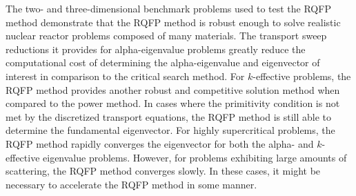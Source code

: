 The two- and three-dimensional benchmark problems used to test the RQFP method demonstrate that the RQFP method is robust enough to solve realistic nuclear reactor problems composed of many materials. The transport sweep reductions it provides for alpha-eigenvalue problems greatly reduce the computational cost of determining the alpha-eigenvalue and eigenvector of interest in comparison to the critical search method. For $k$-effective problems, the RQFP method provides another robust and competitive solution method when compared to the power method. In cases where the primitivity condition is not met by the discretized transport equations, the RQFP method is still able to determine the fundamental eigenvector. For highly supercritical problems, the RQFP method rapidly converges the eigenvector for both the alpha- and $k$-effective eigenvalue problems. However, for problems exhibiting large amounts of scattering, the RQFP method converges slowly. In these cases, it might be necessary to accelerate the RQFP method in some manner. 